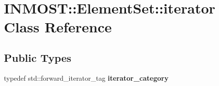 \hypertarget{classINMOST_1_1ElementSet_1_1iterator}{\section{I\-N\-M\-O\-S\-T\-:\-:Element\-Set\-:\-:iterator Class Reference}
\label{classINMOST_1_1ElementSet_1_1iterator}
}
\subsection*{Public Types}
\begin{DoxyCompactItemize}
\item 
\hypertarget{classINMOST_1_1ElementSet_1_1iterator_af18ad6b71f7fd811618b1f1488827790}{typedef std\-::forward\-\_\-iterator\-\_\-tag {\bfseries iterator\-\_\-category}}\label{classINMOST_1_1ElementSet_1_1iterator_af18ad6b71f7fd811618b1f1488827790}

\end{DoxyCompactItemize}
